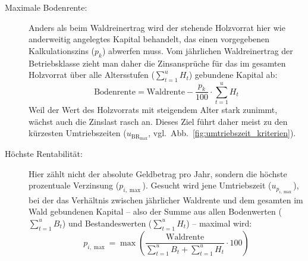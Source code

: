 \documentclass[twocolumn, paper=a4, fontsize=10pt]{scrartcl}
\begin{document}
\begin{description}
\item[Maximale Bodenrente:] Anders als beim Waldreinertrag wird der stehende Holzvorrat hier wie anderweitig angelegtes Kapital behandelt, das einen vorgegebenen Kalkulationszins ($p_k$) abwerfen muss. Vom jährlichen Waldreinertrag der Betriebsklasse zieht man daher die Zinsansprüche für das im gesamten Holzvorrat über alle Altersstufen ($\sum_{t=1}^{u} H_t$) gebundene Kapital ab:
  \begin{equation}
    \text{Bodenrente} = \text{Waldrente} - \frac{p_k}{100} \cdot \sum_{t=1}^{u} H_t
  \end{equation}
  Weil der Wert des Holzvorrats mit steigendem Alter stark zunimmt, wächst auch die Zinslast rasch an. Dieses Ziel führt daher meist zu den kürzesten Umtriebszeiten ($u_{\text{BR}_{\max}}$, vgl.\ Abb.~\ref{fig:umtriebszeit_kriterien}).

\item[Höchste Rentabilität:] Hier zählt nicht der absolute Geldbetrag pro Jahr, sondern die höchste prozentuale Verzinsung ($p_{i,\max}$). Gesucht wird jene Umtriebszeit ($u_{p_{i,\max}}$), bei der das Verhältnis zwischen jährlicher Waldrente und dem gesamten im Wald gebundenen Kapital -- also der Summe aus allen Bodenwerten ($\sum_{t=1}^{u} B_t$) und Bestandeswerten ($\sum_{t=1}^{u} H_t$) -- maximal wird:
  \begin{equation}
    p_{i,\max} = \max \left( \frac{\text{Waldrente}}{\sum_{t=1}^{u} B_t + \sum_{t=1}^{u} H_t} \cdot 100 \right)
  \end{equation}
\end{description}
\end{document}
